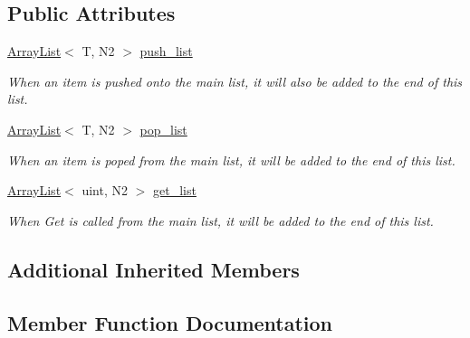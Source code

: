 \subsection*{Public Attributes}
\begin{DoxyCompactItemize}
\item 
\mbox{\label{classutil_1_1ArrayListMock_a326ba7cf4f6e02c78e1cc824acc1e393}} 
\hyperlink{classutil_1_1ArrayList}{Array\+List}$<$ T, N2 $>$ \hyperlink{classutil_1_1ArrayListMock_a326ba7cf4f6e02c78e1cc824acc1e393}{push\+\_\+list}
\begin{DoxyCompactList}\small\item\em When an item is pushed onto the main list, it will also be added to the end of this list. \end{DoxyCompactList}\item 
\mbox{\label{classutil_1_1ArrayListMock_ae07f78f0e7836988bc2316e5df729d5f}} 
\hyperlink{classutil_1_1ArrayList}{Array\+List}$<$ T, N2 $>$ \hyperlink{classutil_1_1ArrayListMock_ae07f78f0e7836988bc2316e5df729d5f}{pop\+\_\+list}
\begin{DoxyCompactList}\small\item\em When an item is poped from the main list, it will be added to the end of this list. \end{DoxyCompactList}\item 
\mbox{\label{classutil_1_1ArrayListMock_a6fb2b91dc699a229c482362702727b10}} 
\hyperlink{classutil_1_1ArrayList}{Array\+List}$<$ uint, N2 $>$ \hyperlink{classutil_1_1ArrayListMock_a6fb2b91dc699a229c482362702727b10}{get\+\_\+list}
\begin{DoxyCompactList}\small\item\em When Get is called from the main list, it will be added to the end of this list. \end{DoxyCompactList}\end{DoxyCompactItemize}
\subsection*{Additional Inherited Members}


\subsection{Member Function Documentation}
\mbox{\label{classutil_1_1ArrayListMock_a84e20a60cd0268edafb36b88c0895b71}} 
